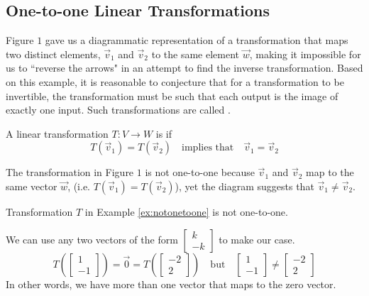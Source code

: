 \documentclass{ximera}
\begin{document}

\subsection*{One-to-one Linear Transformations}
Figure $1$ gave us a diagrammatic representation of a transformation that maps two distinct elements, $\vec{v}_1$ and $\vec{v}_2$ to the same element $\vec{w}$, making it impossible for us to ``reverse the arrows" in an attempt to find the inverse transformation.  Based on this example, it is reasonable to conjecture that for a transformation to be invertible, the transformation must be such that each output is the image of exactly one input.  Such transformations are called .  

\begin{definition}\label{def:onetoone} A linear transformation $T:V\rightarrow W$ is  if 
$$T(\vec{v}_1)=T(\vec{v}_2)\quad \text{implies that}\quad \vec{v}_1=\vec{v}_2$$
\end{definition}

The transformation in Figure $1$ is not one-to-one because $\vec{v}_1$ and $\vec{v}_2$ map to the same vector $\vec{w}$, (i.e. $T(\vec{v}_1)=T(\vec{v}_2)$), yet the diagram suggests that $\vec{v}_1\neq\vec{v}_2$.

\begin{example}\label{ex:notonetoone2}
Transformation $T$ in Example \ref{ex:notonetoone} is not one-to-one.
\begin{explanation}
We can use any two vectors of the form $\begin{bmatrix}k\\-k\end{bmatrix}$ to make our case.  
$$T\left(\begin{bmatrix}1\\-1\end{bmatrix}\right)=\vec{0}=T\left(\begin{bmatrix}-2\\2\end{bmatrix}\right)\quad \text{but}\quad\begin{bmatrix}1\\-1\end{bmatrix}\neq \begin{bmatrix}-2\\2\end{bmatrix}$$
In other words, we have more than one vector that maps to the zero vector.
\end{explanation}
\end{example}
\end{document}
